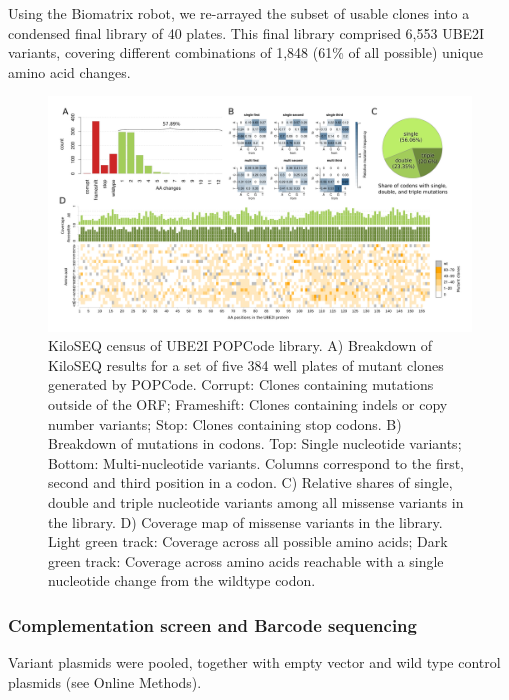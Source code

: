 Using the Biomatrix robot, we re-arrayed the subset of usable clones into a condensed final library of 40 plates. This final library comprised 6,553 UBE2I variants, covering different combinations of 1,848 (61\% of all possible) unique amino acid changes. 




\begin{figure}[h!]
	\centering
	\includegraphics[width=\textwidth]{img/popcode_census.pdf}
	\caption{KiloSEQ census of UBE2I POPCode library. A) Breakdown of KiloSEQ results for a set of five 384 well plates of mutant clones generated by POPCode. Corrupt: Clones containing mutations outside of the ORF; Frameshift: Clones containing indels or copy number variants; Stop: Clones containing stop codons. B) Breakdown of mutations in codons. Top: Single nucleotide variants; Bottom: Multi-nucleotide variants. Columns correspond to the first, second and third position in a codon. C) Relative shares of single, double and triple nucleotide variants among all missense variants in the library. D) Coverage map of missense variants in the library. Light green track: Coverage across all possible amino acids; Dark green track: Coverage across amino acids reachable with a single nucleotide change from the wildtype codon.}
	\label{fig:popcode_census}
\end{figure}


\subsubsection{Complementation screen and Barcode sequencing}

Variant plasmids were pooled, together with empty vector and wild type control plasmids (see Online Methods).


